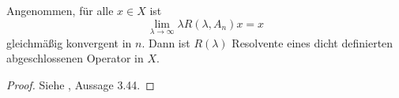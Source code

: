 \begin{prop}\label{Hinreichende Bedingung für Trotter-Kato}
Angenommen, für alle $x\in X$ ist 
\begin{equation*}
\lim_{\lambda\to\infty}\lambda R(\lambda, A_n)x=x
\end{equation*}
gleichmäßig konvergent in $n$. Dann ist $R(\lambda)$ Resolvente eines dicht definierten abgeschlossenen Operator in $X$.
\end{prop}

\begin{proof}
Siehe \cite{banasiak_arlotti_2006}, Aussage 3.44.
\end{proof}







